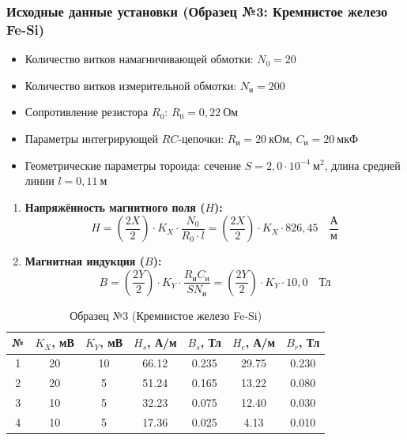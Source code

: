 \documentclass[12pt, letterpaper]{article}
\begin{document}
\subsubsection*{Исходные данные установки (Образец №3: Кремнистое железо Fe-Si)}
\begin{itemize}
    \item Количество витков намагничивающей обмотки: $N_0 = 20$
    \item Количество витков измерительной обмотки: $N_{\text{и}} = 200$
    \item Сопротивление резистора $R_0$: $R_0 = 0{,}22~\text{Ом}$
    \item Параметры интегрирующей $RC$-цепочки: $R_{\text{и}} = 20~\text{кОм}$, $C_{\text{и}} = 20~\text{мкФ}$
    \item Геометрические параметры тороида: сечение $S = 2{,}0 \cdot 10^{-4}~\text{м}^2$, длина средней линии $l = 0{,}11~\text{м}$
\end{itemize}

\begin{enumerate}
    \item \textbf{Напряжённость магнитного поля ($H$):}
    \begin{equation*}
        H = \left(\frac{2X}{2}\right) \cdot K_X \cdot \frac{N_0}{R_0 \cdot l} = \left(\frac{2X}{2}\right) \cdot K_X \cdot 826{,}45 \quad \frac{\text{А}}{\text{м}}
    \end{equation*}
    \item \textbf{Магнитная индукция ($B$):}
    \begin{equation*}
        B = \left(\frac{2Y}{2}\right) \cdot K_Y \cdot \frac{R_{\text{и}} C_{\text{и}}}{S N_{\text{и}}} = \left(\frac{2Y}{2}\right) \cdot K_Y \cdot 10{,}0 \quad \text{Тл}
    \end{equation*}
\end{enumerate}

\begin{table}[h!]
    \centering
    \caption{Образец №3 (Кремнистое железо Fe-Si)}
    \begin{tabular}{|c|c|c|c|c|c|c|}
        \hline
        № & $K_X$, мВ & $K_Y$, мВ & $H_s$, А/м & $B_s$, Тл & $H_c$, А/м & $B_r$, Тл \\ \hline
        1 & 20 & 10 & 66.12 & 0.235 & 29.75 & 0.230 \\
        2 & 20 & 5  & 51.24 & 0.165 & 13.22 & 0.080 \\
        3 & 10 & 5  & 32.23 & 0.075 & 12.40 & 0.030 \\
        4 & 10 & 5  & 17.36 & 0.025 & 4.13  & 0.010 \\ \hline
    \end{tabular}
\end{table}
\end{document}
